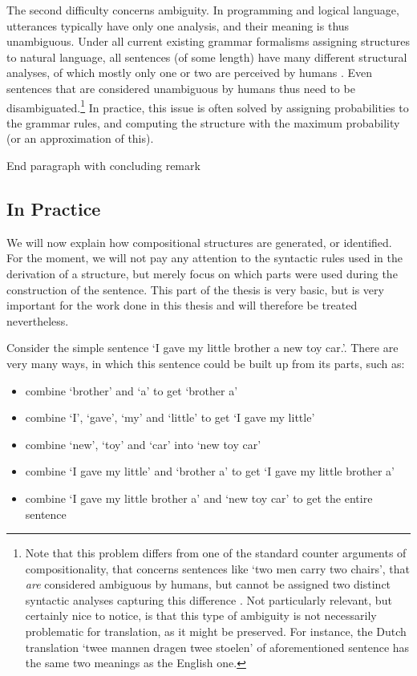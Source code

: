 \documentclass{report}
\theoremstyle{definition}
\theoremstyle{plain}
\begin{document}
The second difficulty concerns ambiguity. In programming and logical language, utterances typically have only one analysis, and their meaning is thus unambiguous. Under all current existing grammar formalisms assigning structures to natural language, all sentences (of some length) have many different structural analyses, of which mostly only one or two are perceived by humans \citep{scha1990taaltheorie}. Even sentences that are considered unambiguous by humans thus need to be disambiguated.\footnote{Note that this problem differs from one of the standard counter arguments of compositionality, that concerns sentences like `two men carry two chairs', that \textit{are} considered ambiguous by humans, but cannot be assigned two distinct syntactic analyses capturing this difference \citep{pelletier1994principle}. Not particularly relevant, but certainly nice to notice, is that this type of ambiguity is not necessarily problematic for translation, as it might be preserved. For instance, the Dutch translation `twee mannen dragen twee stoelen' of aforementioned sentence has the same two meanings as the English one.} In practice, this issue is often solved by assigning probabilities to the grammar rules, and computing the structure with the maximum probability (or an approximation of this).

End paragraph with concluding remark


\subsection{In Practice}

We will now explain how compositional structures are generated, or identified. For the moment, we will not pay any attention to the syntactic rules used in the derivation of a structure, but merely focus on which parts were used during the construction of the sentence. This part of the thesis is very basic, but is very important for the work done in this thesis and will therefore be treated nevertheless.

Consider the simple sentence `I gave my little brother a new toy car.'. There are very many ways, in which this sentence could be built up from its parts, such as:\begin{itemize}
\item combine `brother' and `a' to get `brother a'
\item combine `I', `gave', `my' and `little' to get `I gave my little'
\item combine `new', `toy' and `car' into `new toy car'
\item combine `I gave my little' and `brother a' to get `I gave my little brother a'
\item combine `I gave my little brother a' and `new toy car' to get the entire sentence
\end{itemize}
\end{document}
